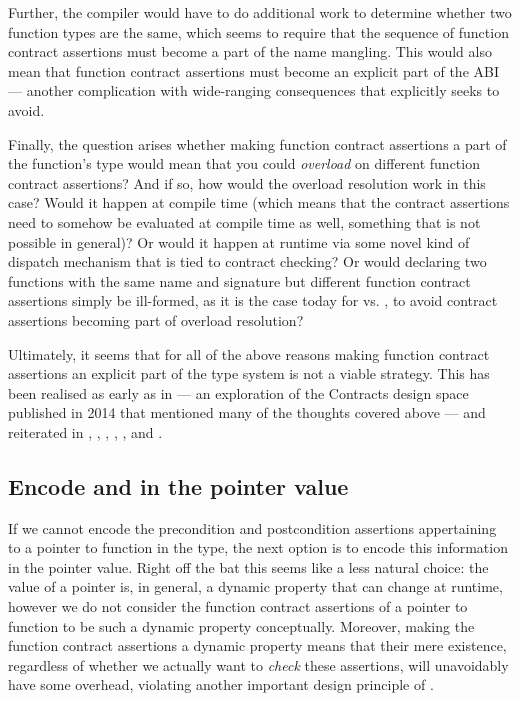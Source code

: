 Further, the compiler would have to do additional work to determine whether two function types are the same, which seems to require that the sequence of function contract assertions must become a part of the name mangling. This would also mean that function contract assertions must become an explicit part of the ABI --- another complication with wide-ranging consequences that \cite{P2900R7} explicitly seeks to avoid.

Finally, the question arises whether making function contract assertions a part of the function's type would mean that you could \emph{overload} on different function contract assertions? And if so, how would the overload resolution work in this case? Would it happen at compile time (which means that the contract assertions need to somehow be evaluated at compile time as well, something that is not possible in general)? Or would it happen at runtime via some novel kind of dispatch mechanism that is tied to contract checking? Or would declaring two functions with the same name and signature but different function contract assertions simply be ill-formed, as it is the case today for  vs. , to avoid contract assertions becoming part of overload resolution?

Ultimately, it seems that for all of the above reasons making function contract assertions an explicit part of the type system is not a viable strategy. This has been realised as early as in \cite{N4110} --- an exploration of the Contracts design space published in 2014 that mentioned many of the thoughts covered above --- and reiterated in \cite{N4415}, \cite{P0246R0}, \cite{P0247R0}, \cite{P0287R0}, \cite{P0380R1}, and \cite{P0542R5}.

\subsection{Encode  and  in the pointer value}

If we cannot encode the precondition and postcondition assertions appertaining to a pointer to function in the type, the next option is to encode this information in the pointer value. Right off the bat this seems like a less natural choice: the value of a pointer is, in general, a dynamic property that can change at runtime, however we do not consider the function contract assertions of a pointer to function to be such a dynamic property conceptually. Moreover, making the function contract assertions a dynamic property means that their mere existence, regardless of whether we actually want to \emph{check} these assertions, will unavoidably have some overhead, violating another important design principle of \cite{P2900R7}.

